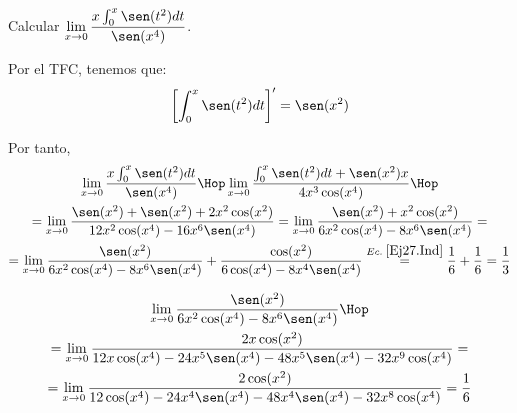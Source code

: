 \begin{ejercicio}
    Calcular $\displaystyle \lim_{x\to 0} \frac{x\int_0^x\sen (t^2) dt}{\sen (x^4)}$.

    Por el TFC, tenemos que:
    \begin{equation*}
        \left[\int_0^x\sen (t^2) dt\right]' = \sen(x^2)
    \end{equation*}

    Por tanto,
    \begin{multline*}
        \lim_{x\to 0} \frac{x\int_0^x\sen (t^2) dt}{\sen (x^4)} \Hop
        \lim_{x\to 0} \frac{\int_0^x\sen (t^2) dt +\sen(x^2)x}{4x^3\cos (x^4)} \Hop \\=
        \lim_{x\to 0} \frac{\sen(x^2) +\sen(x^2) +2x^2\cos(x^2)}{12x^2\cos (x^4) -16x^6\sen(x^4)} =
        \lim_{x\to 0} \frac{\sen(x^2) +x^2\cos(x^2)}{6x^2\cos (x^4) -8x^6\sen(x^4)} = \\=
        \lim_{x\to 0} \frac{\sen(x^2)}{6x^2\cos (x^4) -8x^6\sen(x^4)} + \frac{\cos(x^2)}{6\cos (x^4) -8x^4\sen(x^4)} \stackrel{Ec.\;\ref{Ej27.Ind}}{=} \frac{1}{6} + \frac{1}{6} = \frac{1}{3}
    \end{multline*}

    \begin{multline}\label{Ej27.Ind}
        \lim_{x\to 0} \frac{\sen(x^2)}{6x^2\cos (x^4) -8x^6\sen(x^4)} \Hop \\=
        \lim_{x\to 0} \frac{2x\cos(x^2)}{12x\cos(x^4) -24x^5\sen (x^4) -48x^5\sen(x^4) -32x^9\cos(x^4)} =\\=
        \lim_{x\to 0} \frac{2\cos(x^2)}{12\cos(x^4) -24x^4\sen (x^4) -48x^4\sen(x^4) -32x^8\cos(x^4)} = \frac{1}{6}
    \end{multline}
\end{ejercicio}

